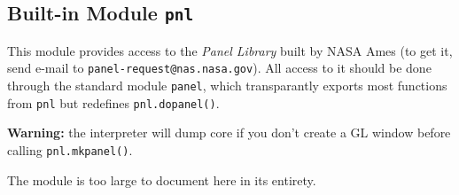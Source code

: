 \subsection{Built-in Module {\tt pnl}}

This module provides access to the
{\em Panel Library}
built by NASA Ames (to get it, send e-mail to
{\tt panel-request@nas.nasa.gov}).
All access to it should be done through the standard module
{\tt panel},
which transparantly exports most functions from
{\tt pnl}
but redefines
{\tt pnl.dopanel()}.

{\bf Warning:}
the {\Python} interpreter will dump core if you don't create a GL window
before calling
{\tt pnl.mkpanel()}.

The module is too large to document here in its entirety.
